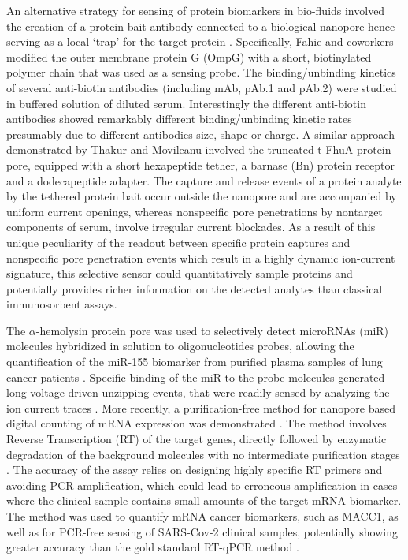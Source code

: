 An alternative strategy for sensing of protein biomarkers in bio-fluids involved the creation of a protein bait antibody connected to a biological nanopore hence serving as a local `trap' for the target protein \cite{Fahie2015,Fahie2015a,Thakur2019a}. Specifically, Fahie and coworkers modified the outer membrane protein G (OmpG) with a short, biotinylated polymer chain that was used as a sensing probe. The binding/unbinding kinetics of several anti-biotin antibodies (including mAb, pAb.1 and pAb.2) were studied in buffered solution of diluted serum. Interestingly the different anti-biotin antibodies showed remarkably different binding/unbinding kinetic rates presumably due to different antibodies size, shape or charge. A similar approach demonstrated by Thakur and Movileanu involved the truncated t-FhuA protein pore, equipped with a short hexapeptide tether, a barnase (Bn) protein receptor and a dodecapeptide adapter. The capture and release events of a protein analyte by the tethered protein bait occur outside the nanopore and are accompanied by uniform current openings, whereas nonspecific pore penetrations by nontarget components of serum, involve irregular current blockades. As a result of this unique peculiarity of the readout between specific protein captures and nonspecific pore penetration events which result in a highly dynamic ion-current signature, this selective sensor could quantitatively sample proteins and potentially provides richer information on the detected analytes than classical immunosorbent assays. 


The $\alpha$-hemolysin protein pore was used to selectively detect microRNAs (miR) mole\-cules hybridized in solution to oligonucleotides probes, allowing the quantification of the miR-155 biomarker from purified plasma samples of lung cancer patients \cite{Wang2011}. Specific binding of the miR to the probe molecules generated long voltage driven unzipping events, that were readily sensed by analyzing the ion current traces \cite{Mathe2004}. More recently, a purifica\-tion-free method for nanopore based digital counting of mRNA expression was demonstrated \cite{Rozevsky2020}. The method involves Reverse Transcription (RT) of the target genes, directly followed by enzymatic degradation of the background molecules with no intermediate purification stages \cite{Rozevsky2020}. The accuracy of the assay relies on designing highly specific RT primers and avoiding PCR amplification, which could lead to erroneous amplification in cases where the clinical sample contains small amounts of the target mRNA biomarker. The method was used to quantify mRNA cancer biomarkers, such as MACC1, as well as for PCR-free sensing of SARS-Cov-2 clinical samples, potentially showing greater accuracy than the gold standard RT-qPCR method \cite{Galenkamp2018,Wang2011}. 



